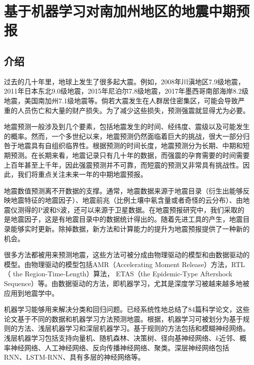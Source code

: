\chapter{基于机器学习对南加州地区的地震中期预报}\label{chap:ml_seismic}

\section{介绍}\label{sec:seis_introduction}

过去的几十年里，地球上发生了很多起大震。例如，2008年川滇地区7.9级地震，2011年日本东北9.0级地震，2015年尼泊尔7.8级地震，2017年墨西哥南部海岸8.2级地震，美国南加州7.1级地震等。倘若大震发生在人群居住密集区，可能会导致严重的人员伤亡和大量的财产损失。为了减少这些损失，预测强震就显得尤为必要。

地震预测一般涉及到几个要素，包括地震发生的时间、经纬度、震级以及可能发生的概率\citep{Allen1976Responsibilities}。然而，一个多世纪以来，地震预测仍然面临着巨大的挑战，很大一部分归咎于地震具有自组织临界性\citep{Geller2007Earthquake}。根据预测的时间长度，地震预测分为长期、中期和短期预测\citep{Zhang2002An,Pulinets2018What}。在长期来看，地震记录只有几十年的数据，而强震的孕育需要的时间需要上百年甚至上千年，因此强震预测并不可靠，而短震的预测又非常具有挑战性。因此，我们将重点关注未来一年的中期地震预报。

地震数值预测离不开数据的支撑。通常，地震数据来源于地震目录（衍生出能够反映地震特征的地震因子）、地震前兆（比例土壤中氡含量或者奇怪的云分布）、由地震仪测得的P波和S波，还可以来源于卫星数据\citep{al2020application}。在地震预报研究中，我们采取的是地震因子，这是有地震目录中的数据统计得出的。随着先进工具的产生，地震目录能够实时更新。除掉数据，新方法和计算能力的提升为地震预报提供了一种新的机会。

很多方法都被用来预测地震，这些方法可被分成由物理驱动的模型和由数据驱动的模型。由物理驱动的模型包括AMR（Accelerating Moment Release）方法\citep{Ben2002Accelerated}，RTL（
the Region-Time-Length）算法\citep{Sobolev2007On}， ETAS（the Epidemic-Type Aftershock Sequence）\citep{Ogata1986Statistical}等。由数据驱动的方法，即机器学习，尤其是深度学习被越来越多地被应用到地震学中\citep{Alves2006Earthquake,Madahizadeh2009prediction,Panakkat2007Neural,Sunkara2009Model}。

机器学习能够用来解决分类和回归问题。\citet{al2020application}已经系统性地总结了84篇科学论文，这些论文基于不同的数据和机器学习方法预测地震。根据\citep{al2020application}，机器学习可被划分为基于规则的方法、浅层机器学习和深层机器学习。基于规则的方法包括\citep{zhong2010prediction,zamani2013application,mirrashid2014earthquake}和模糊神经网络\citep{Lopez2019Evolutionary}。浅层机器学习包括支持向量机\citep{asencio2017temporal}、随机森林\citep{asim2017earthquake}、决策树\citep{asencio2017temporal}、径向基神经网络\citep{Alexandridis2014Large}、$k$近邻\citep{asencio2017temporal,Panakkat2007Neural}、概率神经网络\citep{Adeli2009A}、人工神经网络\citep{morales2013earthquake,asencio2017temporal}、反向传播神经网络\citep{Panakkat2007Neural,Narayanakumar2016A}、聚类\citep{shodiq2018neural}。深层神经网络包括RNN\citep{Panakkat2009Recurrent,asim2017earthquake}、LSTM-RNN\citep{Wang2017Earthquake,Bhatia2018EARTHQUAKE,berhich2020lstm}、具有多层的神经网络\citep{huang2018large}等。

